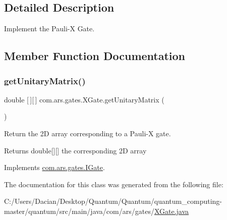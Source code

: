 \subsection{Detailed Description}
Implement the Pauli-\/X Gate. 

\subsection{Member Function Documentation}
\hypertarget{classcom_1_1ars_1_1gates_1_1_x_gate_aa0e495ad8fa7fd0e23ecea6f01c02f6e}{}\label{classcom_1_1ars_1_1gates_1_1_x_gate_aa0e495ad8fa7fd0e23ecea6f01c02f6e} 
\subsubsection{\texorpdfstring{get\+Unitary\+Matrix()}{getUnitaryMatrix()}}
{\footnotesize\ttfamily double \mbox{[}$\,$\mbox{]}\mbox{[}$\,$\mbox{]} com.\+ars.\+gates.\+X\+Gate.\+get\+Unitary\+Matrix (\begin{DoxyParamCaption}{ }\end{DoxyParamCaption})}

Return the 2D array corresponding to a Pauli-\/X gate. \begin{DoxyReturn}{Returns}
double\mbox{[}\mbox{]}\mbox{[}\mbox{]} the corresponding 2D array 
\end{DoxyReturn}


Implements \hyperlink{interfacecom_1_1ars_1_1gates_1_1_i_gate_a6a940b3a6940cd97429aa211143121cb}{com.\+ars.\+gates.\+I\+Gate}.



The documentation for this class was generated from the following file\+:\begin{DoxyCompactItemize}
\item 
C\+:/\+Users/\+Dacian/\+Desktop/\+Quantum/\+Quantum/quantum\+\_\+computing-\/master/quantum/src/main/java/com/ars/gates/\hyperlink{_x_gate_8java}{X\+Gate.\+java}\end{DoxyCompactItemize}
